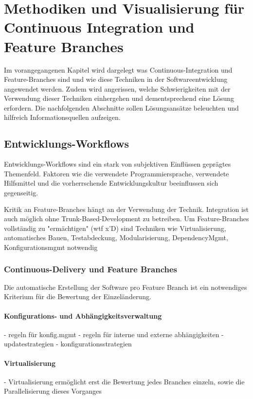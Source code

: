 \chapter{Methodiken und Visualisierung für Continuous Integration und Feature Branches}
\label{ch:visu_meth}

Im vorangegangenen Kapitel wird dargelegt was Continuous-Integration und Feature-Branches sind und wie diese Techniken in der Softwareentwicklung angewendet werden. Zudem wird angerissen, welche Schwierigkeiten mit der Verwendung dieser Techniken einhergehen und dementsprechend eine Lösung erfordern. 
Die nachfolgenden Abschnitte sollen Lösungsansätze beleuchten und hilfreich Informationsquellen aufzeigen.

\section{Entwicklungs-Workflows}

Entwicklungs-Workflows sind ein stark von subjektiven Einflüssen geprägtes Themenfeld. Faktoren wie die verwendete Programmiersprache, verwendete Hilfsmittel und die vorherrschende Entwicklungskultur beeinflussen sich gegenseitig.

Kritik an Feature-Branches hängt an der Verwendung der Technik. Integration ist auch möglich ohne Trunk-Based-Development zu betreiben. Um Feature-Branches vollständig zu "ermächtigen" (wtf x'D) sind Techniken wie Virtualisierung, automatisches Bauen, Testabdeckung, Modularisierung, DependencyMgmt, Konfigurationsmgmt notwendig

\subsection{Continuous-Delivery und Feature Branches}

Die automatische Erstellung der Software pro Feature Branch ist ein notwendiges Kriterium für die Bewertung der Einzeländerung.

\subsubsection{Konfigurations- und Abhängigkeitsverwaltung}
- regeln für konfig.mgmt
- regeln für interne und externe abhängigkeiten
- updatestrategien
- konfigurationsstrategien
\subsubsection{Virtualisierung}
- Virtualisierung ermöglicht erst die Bewertung jedes Branches einzeln, sowie die Parallelisierung dieses Vorganges
